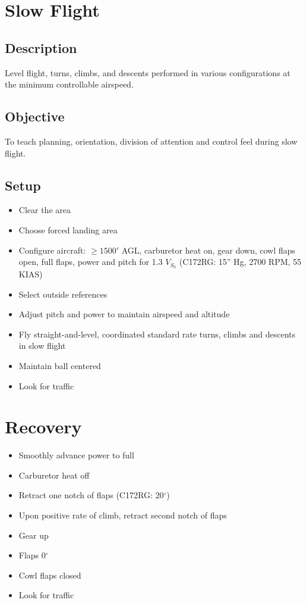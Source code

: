 \section{Slow Flight}

\subsection{Description}

Level flight, turns, climbs, and descents performed in various configurations
at the minimum controllable airspeed.

\subsection{Objective}

To teach planning, orientation, division of attention and control feel during
slow flight.

\subsection{Setup}

\begin{itemize}
  \item Clear the area
  \item Choose forced landing area 
  \item Configure aircraft: $\geq 1500'$ AGL, carburetor heat on, gear down,
    cowl flaps open, full flaps, power and pitch for 1.3 $V_{S_0}$ (C172RG:
    15'' Hg, 2700 RPM, 55 KIAS)
  \item Select outside references 
  \item Adjust pitch and power to maintain airspeed and altitude 
  \item Fly straight-and-level, coordinated standard rate turns, climbs and
    descents in slow flight
  \item Maintain ball centered
  \item Look for traffic
\end{itemize}

\section{Recovery}

\begin{itemize}
  \item Smoothly advance power to full
  \item Carburetor heat off
  \item Retract one notch of flaps (C172RG: 20$^\circ$)
  \item Upon positive rate of climb, retract second notch of flaps
  \item Gear up
  \item Flaps 0$^\circ$
  \item Cowl flaps closed
  \item Look for traffic
\end{itemize}

